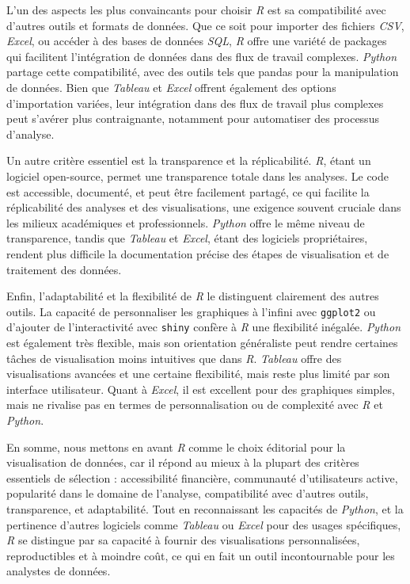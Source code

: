 \documentclass[
  letterpaper,
  DIV=11,
  numbers=noendperiod]{scrreprt}
\begin{document}
L'un des aspects les plus convaincants pour choisir \emph{R} est sa
compatibilité avec d'autres outils et formats de données. Que ce soit
pour importer des fichiers \emph{CSV}, \emph{Excel}, ou accéder à des
bases de données \emph{SQL}, \emph{R} offre une variété de packages qui
facilitent l'intégration de données dans des flux de travail complexes.
\emph{Python} partage cette compatibilité, avec des outils tels que
pandas pour la manipulation de données. Bien que \emph{Tableau} et
\emph{Excel} offrent également des options d'importation variées, leur
intégration dans des flux de travail plus complexes peut s'avérer plus
contraignante, notamment pour automatiser des processus d'analyse.

Un autre critère essentiel est la transparence et la réplicabilité.
\emph{R}, étant un logiciel open-source, permet une transparence totale
dans les analyses. Le code est accessible, documenté, et peut être
facilement partagé, ce qui facilite la réplicabilité des analyses et des
visualisations, une exigence souvent cruciale dans les milieux
académiques et professionnels. \emph{Python} offre le même niveau de
transparence, tandis que \emph{Tableau} et \emph{Excel}, étant des
logiciels propriétaires, rendent plus difficile la documentation précise
des étapes de visualisation et de traitement des données.

Enfin, l'adaptabilité et la flexibilité de \emph{R} le distinguent
clairement des autres outils. La capacité de personnaliser les
graphiques à l'infini avec \texttt{ggplot2} ou d'ajouter de
l'interactivité avec \texttt{shiny} confère à \emph{R} une flexibilité
inégalée. \emph{Python} est également très flexible, mais son
orientation généraliste peut rendre certaines tâches de visualisation
moins intuitives que dans \emph{R}. \emph{Tableau} offre des
visualisations avancées et une certaine flexibilité, mais reste plus
limité par son interface utilisateur. Quant à \emph{Excel}, il est
excellent pour des graphiques simples, mais ne rivalise pas en termes de
personnalisation ou de complexité avec \emph{R} et \emph{Python}.

En somme, nous mettons en avant \emph{R} comme le choix éditorial pour
la visualisation de données, car il répond au mieux à la plupart des
critères essentiels de sélection : accessibilité financière, communauté
d'utilisateurs active, popularité dans le domaine de l'analyse,
compatibilité avec d'autres outils, transparence, et adaptabilité. Tout
en reconnaissant les capacités de \emph{Python}, et la pertinence
d'autres logiciels comme \emph{Tableau} ou \emph{Excel} pour des usages
spécifiques, \emph{R} se distingue par sa capacité à fournir des
visualisations personnalisées, reproductibles et à moindre coût, ce qui
en fait un outil incontournable pour les analystes de données.
\end{document}

